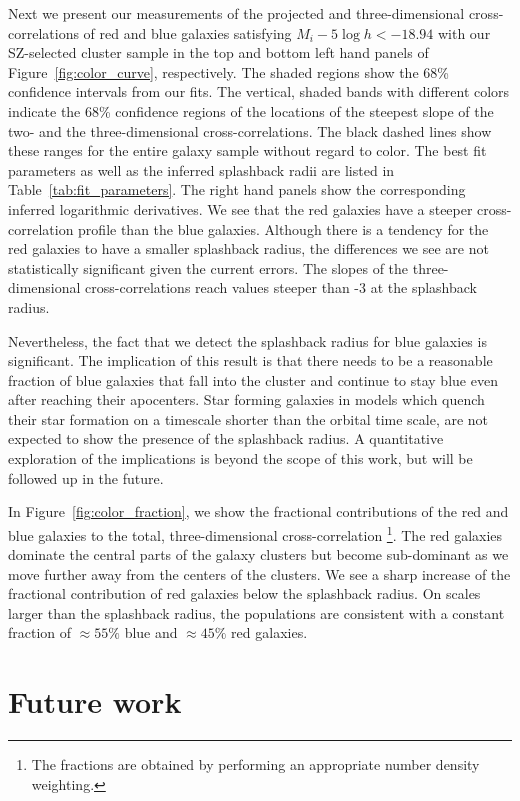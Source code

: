 \documentclass[iop, apjl, twocolappendix, numberedappendix]{emulateapj}
\begin{document}
Next we present our measurements of the projected and
three-dimensional cross-correlations of red and blue galaxies
satisfying $M_{i}-5\log h<-18.94$ with our SZ-selected cluster
sample in the top and bottom left hand panels of
Figure~\ref{fig:color_curve}, respectively. The shaded regions show
the 68\% confidence intervals from our fits. The vertical, shaded
bands with different colors indicate the 68\% confidence regions of
the locations of the steepest slope of the two- and the
three-dimensional cross-correlations. The black dashed lines show
these ranges for the entire galaxy sample without regard to color.
The best fit parameters as well as the inferred splashback radii are
listed in Table~\ref{tab:fit_parameters}. The right hand
panels show the corresponding inferred logarithmic derivatives. We
see that the red galaxies have a steeper cross-correlation profile
than the blue galaxies. Although there is a tendency for the red
galaxies to have a smaller splashback radius, the differences we see
are not statistically significant given the current errors. The
slopes of the three-dimensional cross-correlations reach values
steeper than -3 at the splashback radius.

Nevertheless, the fact that we detect the splashback radius for blue
galaxies is significant. The implication of this result is that
there needs to be a reasonable fraction of blue galaxies that fall
into the cluster and continue to stay blue even after reaching their
apocenters. Star forming galaxies in models which quench their star
formation on a timescale shorter than the orbital time scale, are
not expected to show the presence of the splashback radius. A
quantitative exploration of the implications is beyond the scope of
this work, but will be followed up in the future.

In Figure~\ref{fig:color_fraction}, we show the fractional
contributions of the red and blue galaxies to the total,
three-dimensional cross-correlation \footnote{The fractions are
obtained by performing an appropriate number density weighting.}.
The red galaxies dominate the central parts of the galaxy clusters
but become sub-dominant as we move further away from the centers of the 
clusters. We see a sharp increase of the fractional contribution of
red galaxies below the splashback radius. On scales larger than the
splashback radius, the populations are consistent with a constant
fraction of $\approx 55\%$ blue and $\approx 45\%$ red galaxies.

\section{Future work}
\label{sec:Future}
\end{document}
